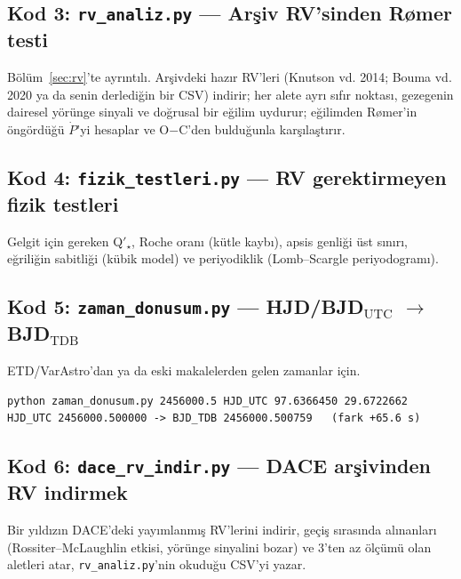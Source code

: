 \subsection{Kod 3: \texttt{rv\_analiz.py} — Arşiv RV'sinden Rømer testi}
Bölüm~\ref{sec:rv}'te ayrıntılı. Arşivdeki hazır RV'leri (Knutson vd. 2014; Bouma vd. 2020 ya da senin derlediğin bir
CSV) indirir; her alete ayrı sıfır noktası, gezegenin dairesel yörünge sinyali ve doğrusal bir eğilim uydurur;
eğilimden Rømer'in öngördüğü $\dot P$'yi hesaplar ve O$-$C'den bulduğunla karşılaştırır.


\subsection{Kod 4: \texttt{fizik\_testleri.py} — RV gerektirmeyen fizik testleri}
Gelgit için gereken Q$'_\star$, Roche oranı (kütle kaybı), apsis genliği üst sınırı, eğriliğin sabitliği (kübik model)
ve periyodiklik (Lomb–Scargle periyodogramı).


\subsection{Kod 5: \texttt{zaman\_donusum.py} — HJD/BJD$_\mathrm{UTC}$ $\rightarrow$ BJD$_\mathrm{TDB}$}
ETD/VarAstro'dan ya da eski makalelerden gelen zamanlar için.


\begin{lstlisting}[style=kabuk]
python zaman_donusum.py 2456000.5 HJD_UTC 97.6366450 29.6722662
HJD_UTC 2456000.500000 -> BJD_TDB 2456000.500759   (fark +65.6 s)
\end{lstlisting}

\subsection{Kod 6: \texttt{dace\_rv\_indir.py} — DACE arşivinden RV indirmek}
Bir yıldızın DACE'deki yayımlanmış RV'lerini indirir, geçiş sırasında alınanları (Rossiter–McLaughlin etkisi, yörünge
sinyalini bozar) ve 3'ten az ölçümü olan aletleri atar, \texttt{rv\_analiz.py}'nin okuduğu CSV'yi yazar.


